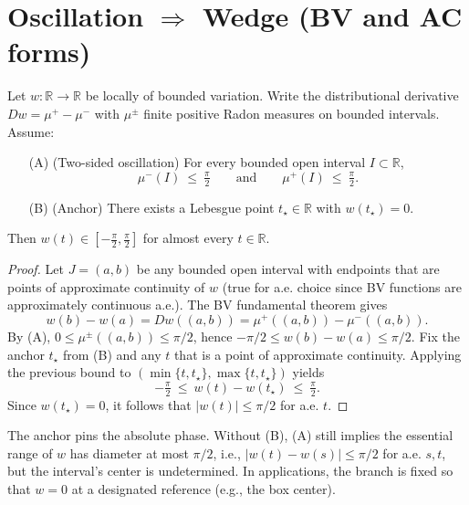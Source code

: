 
\section*{Oscillation $\Rightarrow$ Wedge (BV and AC forms)}

\begin{lemma}\label{lem:OscToWedgeBV}
Let $w:\mathbb{R}\to\mathbb{R}$ be locally of bounded variation. Write the distributional derivative $Dw=\mu^+-\mu^-$ with $\mu^\pm$ finite positive Radon measures on bounded intervals. Assume:
\begin{itemize}
\item[(A)] (Two-sided oscillation) For every bounded open interval $I\subset\mathbb{R}$,
\[ \mu^-(I)\ \le\ \tfrac{\pi}{2}\qquad\text{and}\qquad \mu^+(I)\ \le\ \tfrac{\pi}{2}. \]
\item[(B)] (Anchor) There exists a Lebesgue point $t_\star\in\mathbb{R}$ with $w(t_\star)=0$.
\end{itemize}
Then $w(t)\in[-\tfrac{\pi}{2},\tfrac{\pi}{2}]$ for almost every $t\in\mathbb{R}$.
\end{lemma}

\begin{proof}
Let $J=(a,b)$ be any bounded open interval with endpoints that are points of approximate continuity of $w$ (true for a.e. choice since BV functions are approximately continuous a.e.). The BV fundamental theorem gives
\[ w(b)-w(a)=Dw((a,b))=\mu^+((a,b)) - \mu^-((a,b)). \]
By (A), $0\le \mu^\pm((a,b))\le \pi/2$, hence $-\pi/2\le w(b)-w(a)\le \pi/2$. Fix the anchor $t_\star$ from (B) and any $t$ that is a point of approximate continuity. Applying the previous bound to $(\min\{t,t_\star\},\max\{t,t_\star\})$ yields
\[ -\tfrac{\pi}{2}\ \le\ w(t)-w(t_\star)\ \le\ \tfrac{\pi}{2}. \]
Since $w(t_\star)=0$, it follows that $|w(t)|\le \pi/2$ for a.e. $t$.
\end{proof}

\begin{remark}
The anchor pins the absolute phase. Without (B), (A) still implies the essential range of $w$ has diameter at most $\pi/2$, i.e., $|w(t)-w(s)|\le \pi/2$ for a.e. $s,t$, but the interval’s center is undetermined. In applications, the branch is fixed so that $w=0$ at a designated reference (e.g., the box center).
\end{remark}

